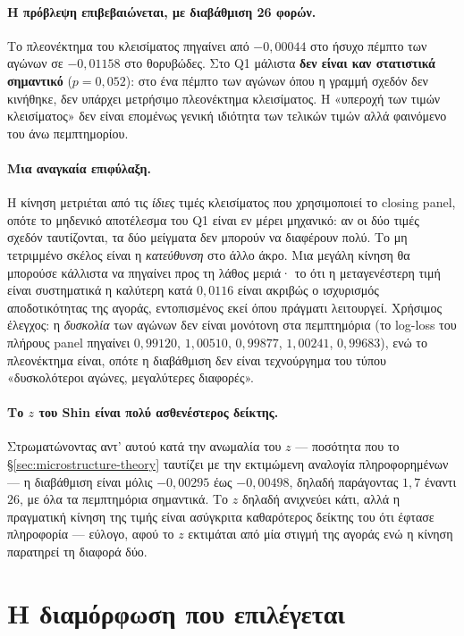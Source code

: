 \documentclass[12pt,a4paper,oneside]{report}
\renewcommand{\_}{\oldunderscore\allowbreak}
\theoremstyle{definition}
\theoremstyle{plain}
\theoremstyle{remark}
\begin{document}
\paragraph{Η πρόβλεψη επιβεβαιώνεται, με διαβάθμιση 26 φορών.} Το πλεονέκτημα του κλεισίματος
πηγαίνει από $-0{,}00044$ στο ήσυχο πέμπτο των αγώνων σε $-0{,}01158$ στο θορυβώδες. Στο Q1
μάλιστα \textbf{δεν είναι καν στατιστικά σημαντικό} ($p=0{,}052$): στο ένα πέμπτο των αγώνων
όπου η γραμμή σχεδόν δεν κινήθηκε, δεν υπάρχει μετρήσιμο πλεονέκτημα κλεισίματος. Η «υπεροχή
των τιμών κλεισίματος» δεν είναι επομένως γενική ιδιότητα των τελικών τιμών αλλά φαινόμενο
του άνω πεμπτημορίου.

\paragraph{Μια αναγκαία επιφύλαξη.} Η κίνηση μετριέται από τις \emph{ίδιες} τιμές κλεισίματος
που χρησιμοποιεί το closing panel, οπότε το μηδενικό αποτέλεσμα του Q1 είναι εν μέρει
μηχανικό: αν οι δύο τιμές σχεδόν ταυτίζονται, τα δύο μείγματα δεν μπορούν να διαφέρουν πολύ.
Το μη τετριμμένο σκέλος είναι η \emph{κατεύθυνση} στο άλλο άκρο. Μια μεγάλη κίνηση θα
μπορούσε κάλλιστα να πηγαίνει προς τη λάθος μεριά· το ότι η μεταγενέστερη τιμή είναι
συστηματικά η καλύτερη κατά $0{,}0116$ είναι ακριβώς ο ισχυρισμός αποδοτικότητας της αγοράς,
εντοπισμένος εκεί όπου πράγματι λειτουργεί. Χρήσιμος έλεγχος: η \emph{δυσκολία} των αγώνων
δεν είναι μονότονη στα πεμπτημόρια (το log-loss του πλήρους panel πηγαίνει $0{,}99120$,
$1{,}00510$, $0{,}99877$, $1{,}00241$, $0{,}99683$), ενώ το πλεονέκτημα είναι, οπότε η
διαβάθμιση δεν είναι τεχνούργημα του τύπου «δυσκολότεροι αγώνες, μεγαλύτερες διαφορές».

\paragraph{Το $z$ του Shin είναι πολύ ασθενέστερος δείκτης.} Στρωματώνοντας αντ' αυτού κατά
την ανωμαλία του $z$ --- ποσότητα που το \S\ref{sec:microstructure-theory} ταυτίζει με την
εκτιμώμενη αναλογία πληροφορημένων --- η διαβάθμιση είναι μόλις $-0{,}00295$ έως
$-0{,}00498$, δηλαδή παράγοντας $1{,}7$ έναντι $26$, με όλα τα πεμπτημόρια σημαντικά. Το $z$
δηλαδή ανιχνεύει κάτι, αλλά η πραγματική κίνηση της τιμής είναι ασύγκριτα καθαρότερος
δείκτης του ότι έφτασε πληροφορία --- εύλογο, αφού το $z$ εκτιμάται από μία στιγμή της
αγοράς ενώ η κίνηση παρατηρεί τη διαφορά δύο.

\section{Η διαμόρφωση που επιλέγεται}
\label{sec:res-config}
\end{document}
